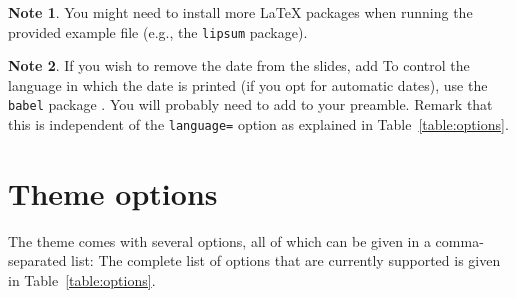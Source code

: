 \documentclass[a4paper,10pt]{article}
\theoremstyle{definition}
\newtheorem{note}{Note}
\begin{document}
\begin{note}
  You might need to install more \LaTeX{} packages when running the provided example file (e.g., the \texttt{lipsum} package).
\end{note}

\begin{note}
  If you wish to remove the date from the slides, add
  To control the language in which the date is printed (if you opt for automatic dates), use the \texttt{babel} package \cite{babel}. You will probably need to add
  to your preamble. Remark that this is independent of the \texttt{language=} option as explained in Table~\ref{table:options}.
\end{note}



\section{Theme options}

The theme comes with several options, all of which can be given in a comma-separated list:
The complete list of options that are currently supported is given in Table~\ref{table:options}.
\end{document}

